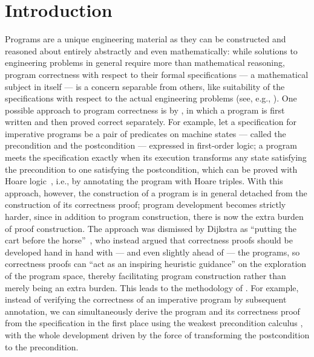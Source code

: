 \chapter{Introduction}
\label{chap:introduction}

Programs are a unique engineering material as they can be constructed and reasoned about entirely abstractly and even mathematically: while solutions to engineering problems in general require more than mathematical reasoning, program correctness with respect to their formal specifications --- a mathematical subject in itself --- is a concern separable from others, like suitability of the specifications with respect to the actual engineering problems (see, e.g., \citet{Dijkstra-EWD447}).
One possible approach to program correctness is by , in which a program is first written and then proved correct separately.
For example, let a specification for imperative programs be a pair of predicates on machine states --- called the precondition and the postcondition --- expressed in first-order logic; a program meets the specification exactly when its execution transforms any state satisfying the precondition to one satisfying the postcondition, which can be proved with Hoare logic~\citep{Hoare-logic}, i.e., by annotating the program with Hoare triples.
With this approach, however, the construction of a program is in general detached from the construction of its correctness proof; program development becomes strictly harder, since in addition to program construction, there is now the extra burden of proof construction.
The approach was dismissed by Dijkstra as ``putting the cart before the horse''~\citep{Dijkstra-EWD361}, who instead argued that correctness proofs should be developed hand in hand with --- and even slightly ahead of --- the programs, so correctness proofs can ``act as an inspiring heuristic guidance'' on the exploration of the program space, thereby facilitating program construction rather than merely being an extra burden.
This leads to the methodology of .
For example, instead of verifying the correctness of an imperative program by subsequent annotation, we can simultaneously derive the program and its correctness proof from the specification in the first place using the weakest precondition calculus \citep{Dijkstra-discipline, Gries-science-of-programming, Kaldewaij-derivation}, with the whole development driven by the force of transforming the postcondition to the precondition.

